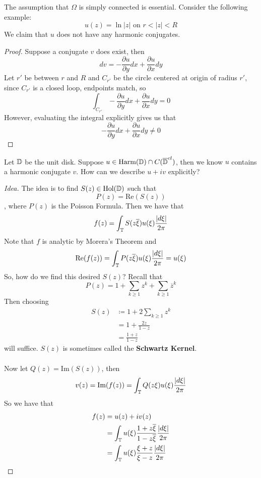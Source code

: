 \documentclass{article}
\begin{document}
\begin{remark}
    The assumption that $\Omega$ is simply connected is essential. Consider the following example:
    \[u(z) = \ln |z| \text{ on } r < |z| < R\]
    We claim that $u$ does not have any harmonic conjugates.
\end{remark}

\begin{proof}
Suppose a conjugate $v$ does exist, then
\[dv = - \frac{\partial u}{\partial y} dx + \frac{\partial u}{\partial x} dy\]
Let $r'$ be between $r$ and $R$ and $C_{r'}$ be the circle centered at origin of radius $r'$, since $C_{r'}$ is a closed loop, endpoints match, so
\[\int_{C_{r'}} - \frac{\partial u}{\partial y} dx + \frac{\partial u}{\partial x} dy = 0\]
However, evaluating the integral explicitly gives us that 
\[- \frac{\partial u}{\partial y} dx + \frac{\partial u}{\partial x} dy \neq 0\]
\end{proof}

\begin{question}
    Let $\mathbb{D}$ be the unit disk. Suppose $u \in \text{Harm}(\mathbb{D}) \cap C(\overline{\mathbb{D}}^{cl})$, then we know $u$ contains a harmonic conjugate $v$. How can we describe $u + iv$ explicitly?
\end{question}

\begin{proof}[Idea]
The idea is to find $S(z) \in \text{Hol}(\mathbb{D})$ such that
\[P(z) = \text{Re}(S(z))\]
, where $P(z)$ is the Poisson Formula. Then we have that
\[f(z) = \int_{\mathbb{T}} S(z \overline{\xi}) u(\xi) \frac{|d\xi|}{2\pi}\]
Note that $f$ is analytic by Morera's Theorem and
\[\text{Re}(f(z)) = \int_{\mathbb{T}} P(z \overline{\xi}) u(\xi) \frac{|d\xi|}{2\pi} = u(\xi)\]
So, how do we find this desired $S(z)$? Recall that
\[P(z) = 1 + \sum_{k \geq 1} z^k + \sum_{k \geq 1} \overline{z}^k\]
Then choosing
\begin{align*}
    S(z) &\coloneqq 1 + 2 \sum_{k \geq 1} z^k\\
    &= 1 + \frac{2z}{1 - z} \tag*{Domain of $S(z)$ is $\Dbb$}\\
    &= \frac{1 + z}{1 - z}
\end{align*}
will suffice. $S(z)$ is sometimes called the \textbf{Schwartz Kernel}.\\\\
Now let $Q(z) = \text{Im}(S(z))$, then
\[v(z) = \text{Im}(f(z)) = \int_{\mathbb{T}} Q(z \xi) u(\xi) \frac{|d\xi|}{2\pi}\]
So we have that
\begin{align*}
    f(z) &= u(z) + i v(z)\\
    &= \int_{\mathbb{T}} u(\xi) \frac{1 + z \overline{\xi}}{1 - z \overline{\xi}} \frac{|d\xi|}{2\pi}\\
    &= \int_{\mathbb{T}} u(\xi) \frac{\xi + z}{\xi - z} \frac{|d\xi|}{2\pi}
\end{align*}
\end{proof}
\end{document}
